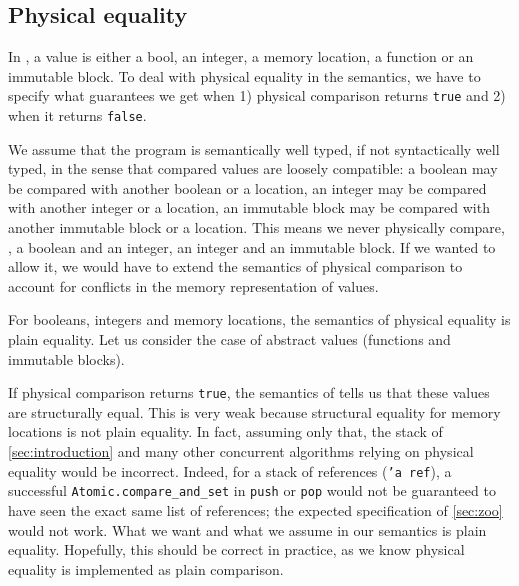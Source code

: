 \subsection{Physical equality}
\label{sec:physical_equality}

In \Zoo, a value is either a bool, an integer, a memory location, a function or an immutable block.
To deal with physical equality in the semantics, we have to specify what guarantees we get when 1) physical comparison returns \texttt{true} and 2) when it returns \texttt{false}.

We assume that the program is semantically well typed, if not syntactically well typed, in the sense that compared values are loosely compatible: a boolean may be compared with another boolean or a location, an integer may be compared with another integer or a location, an immutable block may be compared with another immutable block or a location.
This means we never physically compare, \eg, a boolean and an integer, an integer and an immutable block.
If we wanted to allow it, we would have to extend the semantics of physical comparison to account for conflicts in the memory representation of values.

For booleans, integers and memory locations, the semantics of physical equality is plain equality.
Let us consider the case of abstract values (functions and immutable blocks).

If physical comparison returns \texttt{true}, the semantics of \OCaml tells us that these values are structurally equal.
This is very weak because structural equality for memory locations is not plain equality.
In fact, assuming only that, the stack of \cref{sec:introduction} and many other concurrent algorithms relying on physical equality would be incorrect.
Indeed, for \eg a stack of references (\texttt{'a ref}), a successful \texttt{Atomic.compare_and_set} in \texttt{push} or \texttt{pop} would not be guaranteed to have seen the exact same list of references; the expected specification of \cref{sec:zoo} would not work.
What we want and what we assume in our semantics is plain equality.
Hopefully, this should be correct in practice, as we know physical equality is implemented as plain comparison.

